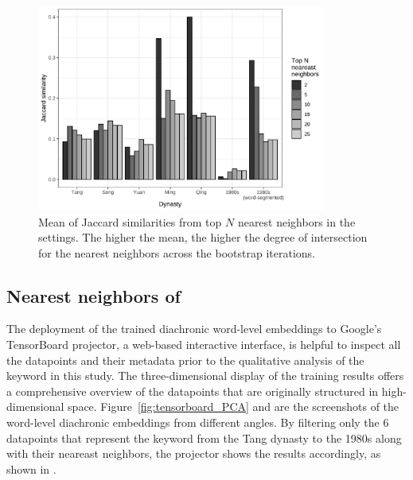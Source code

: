 \begin{figure}[H]
  \centering
  \includegraphics[width=0.85\textwidth,keepaspectratio]{figures_new/bootstrap_for_stability/jaccard_similarity_grey.pdf}
  \caption{Mean of Jaccard similarities from top $N$ nearest neighbors in the  settings. The higher the mean, the higher the degree of intersection for the nearest neighbors across the bootstrap iterations.} \label{fig:stability_jaccard}
\end{figure}

\subsection{Nearest neighbors of \jia}
The deployment of the trained diachronic word-level embeddings to Google's TensorBoard projector, a web-based interactive interface, is helpful to inspect all the datapoints and their metadata prior to the qualitative analysis of the keyword \jia in this study. The three-dimensional display of the training results offers a comprehensive overview of the datapoints that are originally structured in high-dimensional space. Figure~\ref{fig:tensorboard_PCA} and  are the screenshots of the word-level diachronic embeddings from different angles. By filtering only the 6 datapoints that represent the keyword \jia from the Tang dynasty to the 1980s along with their neareast neighbors, the projector shows the results accordingly, as shown in .

